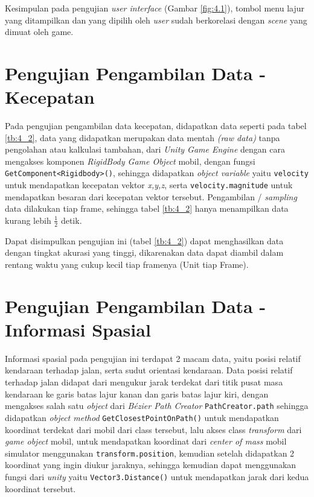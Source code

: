 Kesimpulan pada pengujian \textit{user interface} (Gambar \ref{fig:4.1}), tombol menu lajur yang ditampilkan dan yang dipilih oleh \textit{user} sudah berkorelasi dengan \textit{scene} yang dimuat oleh game.

\section{Pengujian Pengambilan Data - Kecepatan}
\vspace{1ex}

Pada pengujian pengambilan data kecepatan, didapatkan data seperti pada tabel \ref{tb:4_2}, data yang didapatkan merupakan data mentah \textit{(raw data)} tanpa pengolahan atau kalkulasi tambahan, dari \textit{Unity Game Engine} dengan cara mengakses komponen \textit{RigidBody Game Object} mobil, dengan fungsi \texttt{GetComponent<Rigidbody>()}, sehingga didapatkan \textit{object variable} yaitu \texttt{velocity} untuk mendapatkan kecepatan vektor \textit{x,y,z}, serta \texttt{velocity.magnitude} untuk mendapatkan besaran dari kecepatan vektor tersebut. Pengambilan / \textit{sampling} data dilakukan tiap frame, sehingga tabel \ref{tb:4_2} hanya menampilkan data kurang lebih $\frac{1}{2}$ detik.

Dapat disimpulkan pengujian ini (tabel \ref{tb:4_2}) dapat menghasilkan data dengan tingkat akurasi yang tinggi, dikarenakan data dapat diambil dalam rentang waktu yang cukup kecil tiap framenya (Unit tiap Frame).

\section{Pengujian Pengambilan Data - Informasi Spasial}
\vspace{1ex}

Informasi spasial pada pengujian ini terdapat 2 macam data, yaitu posisi relatif kendaraan terhadap jalan, serta sudut orientasi kendaraan. Data posisi relatif terhadap jalan didapat dari mengukur jarak terdekat dari titik pusat masa kendaraan ke garis batas lajur kanan dan garis batas lajur kiri, dengan mengakses salah satu \textit{object} dari \textit{Bézier Path Creator}\cite{cit:16} \texttt{PathCreator.path} sehingga didapatkan \textit{object method} \texttt{GetClosestPointOnPath()} untuk mendapatkan koordinat terdekat dari mobil dari class tersebut, lalu akses class \textit{transform} dari \textit{game object} mobil, untuk mendapatkan koordinat dari \textit{center of mass} mobil simulator menggunakan \texttt{transform.position}, kemudian setelah didapatkan 2 koordinat yang ingin  diukur jaraknya, sehingga kemudian dapat menggunakan fungsi dari \textit{unity} yaitu \texttt{Vector3.Distance()} untuk mendapatkan jarak dari kedua koordinat tersebut. 

